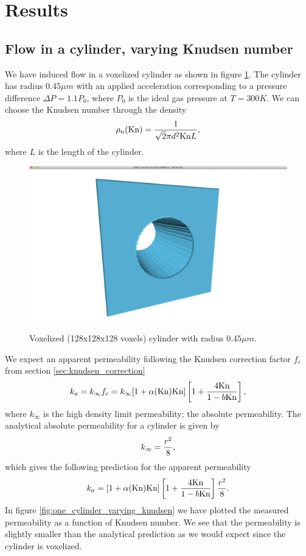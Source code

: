 \section{Results}
\subsection{Flow in a cylinder, varying Knudsen number}
We have induced flow in a voxelized cylinder as shown in figure \ref{fig:cylinder_flow}. The cylinder has radius $0.45 \mu m$ with an applied acceleration corresponding to a pressure difference $\Delta P = 1.1P_0$, where $P_0$ is the ideal gas pressure at $T=300K$. We can choose the Knudsen number through the density
\begin{align}
	\rho_n(\text{Kn}) = {1\over \sqrt 2 \pi d^2 \text{Kn}L},
\end{align}
where $L$ is the length of the cylinder. 

\begin{figure}[h]
\begin{center}
\includegraphics[width=\textwidth, trim=0cm 0cm 0cm 0cm, clip]{DSMC/figures/cylinder.png}
\label{fig:cylinder_flow}
\end{center}
\caption{Voxelized (128x128x128 voxels) cylinder with radius $0.45\mu m$.}
\end{figure}
We expect an apparent permeability following the Knudsen correction factor $f_c$ from section \ref{sec:knudsen_correction}
\begin{align}
	k_a = k_\infty f_c = k_\infty[1 + \alpha(\text{Kn})\text{Kn}]\left[1 + {4\text{Kn}\over 1 - b\text{Kn}}\right],
\end{align}
where $k_\infty$ is the high density limit permeability; the absolute permeability. The analytical absolute permeability for a cylinder is given by\cite{karniadakis2005microflows}
\begin{align}
	\label{eq:permeability_cylinder}
	k_\infty = {r^2\over 8},
\end{align}
which gives the following prediction for the apparent permeability
\begin{align}
	k_a = [1 + \alpha(\text{Kn})\text{Kn}]\left[1 + {4\text{Kn}\over 1 - b\text{Kn}}\right] {r^2\over 8}.
\end{align}
In figure \ref{fig:one_cylinder_varying_knudsen} we have plotted the measured permeability as a function of Knudsen number. We see that the permeability is slightly smaller than the analytical prediction as we would expect since the cylinder is voxelized.


